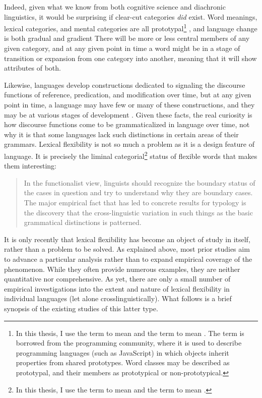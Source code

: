 Indeed, given what we know from both cognitive science and diachronic linguistics, it would be surprising if clear-cut categories \emph{did} exist. Word meanings, lexical categories, and mental categories are all prototypal\footnote{In this thesis, I use the term  to mean  and the term  to mean . The term  is borrowed from the programming community, where it is used to describe programming languages (such as JavaScript) in which objects inherit properties from shared prototypes. Word classes may be described as prototypal, and their members as prototypical or non-prototypical.} \parencite{Taylor2003}, and language change is both gradual and gradient \parencites{HopperTraugott2003}{TraugottTrousdale2010} There will be more or less central members of any given category, and at any given point in time a word might be in a stage of transition or expansion from one category into another, meaning that it will show attributes of both.

Likewise, languages develop constructions dedicated to signaling the discourse functions of reference, predication, and modification over time, but at any given point in time, a language may have few or many of these constructions, and they may be at various stages of development \parencite{Vogel2000}. Given these facts, the real curiosity is how discourse functions come to be grammaticalized in language over time, not why it is that some languages lack such distinctions in certain areas of their grammars. Lexical flexibility is not so much a problem as it is a design feature of language. It is precisely the liminal categorial\footnote{In this thesis, I use the term  to mean  and the term  to mean .} status of flexible words that makes them interesting:

\blockquote[{\cite[23]{Croft1991}}]{In the functionalist view, linguists should recognize the boundary status of the cases in question and try to understand why they are boundary cases. The major empirical fact that has led to concrete results for typology is the discovery that the cross-linguistic variation in such things as the basic grammatical distinctions is patterned.}

It is only recently that lexical flexibility has become an object of study in itself, rather than a problem to be solved. As explained above, most prior studies aim to advance a particular analysis rather than to expand empirical coverage of the phenomenon. While they often provide numerous examples, they are neither quantitative nor comprehensive. As yet, there are only a small number of empirical investigations into the extent and nature of lexical flexibility in individual languages (let alone crosslinguistically). What follows is a brief synopsis of the existing studies of this latter type.

